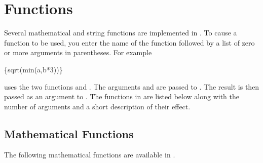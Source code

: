 \chapter{Functions}\label{ch:functions}

Several mathematical and string functions are implemented in
\aprepro{}.  To cause a function to be used, you enter the name
of the function followed by a list of zero or more arguments in
parentheses. For example
\begin{apinp}
\{sqrt(min(a,b*3))\}
\end{apinp}
uses the two functions  and . The arguments 
and  are passed to . The result is then passed as an
argument to . The functions in \aprepro{} are listed below
along with the number of arguments and a short description of their effect.

\section{Mathematical Functions}

The following mathematical functions are available in \aprepro{}.


